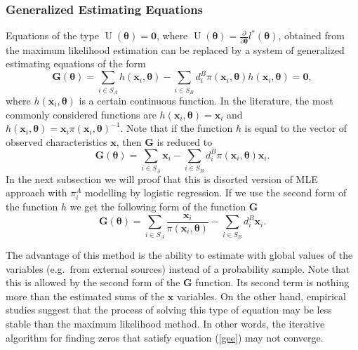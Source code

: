 \documentclass[
]{jss}
\begin{document}
\subsubsection{Generalized Estimating Equations}\label{sec-ipw-gee}

Equations of the type
\(\operatorname{U}(\boldsymbol{\theta}) = \boldsymbol{0}\), where
\(\operatorname{U}(\boldsymbol{\theta}) = \frac{\partial}{\partial \boldsymbol{\theta}} l^*(\boldsymbol{\theta})\),
obtained from the maximum likelihood estimation can be replaced by a
system of generalized estimating equations of the form \begin{equation}
\label{gee}
\mathbf{G}(\boldsymbol{\theta})=\sum_{i \in S_A} h\left(\boldsymbol{x}_i, \boldsymbol{\theta}\right)-\sum_{i \in S_B} d_i^B \pi\left(\boldsymbol{x}_i, \boldsymbol{\theta}\right) h\left(\boldsymbol{x}_i, \boldsymbol{\theta}\right) = \boldsymbol{0},
\end{equation} where
\(h\left(\boldsymbol{x}_i, \boldsymbol{\theta}\right)\) is a certain
continuous function. In the literature, the most commonly considered
functions are
\(h\left(\boldsymbol{x}_i, \boldsymbol{\theta}\right) = \boldsymbol{x}_i\)
and
\(h\left(\boldsymbol{x}_i, \boldsymbol{\theta}\right) = \boldsymbol{x}_i \pi\left(\boldsymbol{x}_i, \boldsymbol{\theta}\right)^{-1}\).
Note that if the function \(h\) is equal to the vector of observed
characteristics \(\boldsymbol{x}\), then \(\mathbf{G}\) is reduced to \[
\mathbf{G}(\boldsymbol{\theta}) = \sum_{i \in S_A} \boldsymbol{x}_i-\sum_{i \in S_B} d_i^B \pi\left(\boldsymbol{x}_i, \boldsymbol{\theta}\right) \boldsymbol{x}_i.
\] In the next subsection we will proof that this is disorted version of
MLE approach with \(\pi_i^A\) modelling by logistic regression. If we
use the second form of the function \(h\) we get the following form of
the function \(\mathbf{G}\) \[
\mathbf{G}(\boldsymbol{\theta}) = \sum_{i \in S_A} \frac{\boldsymbol{x}_i}{\pi\left(\boldsymbol{x}_i, \boldsymbol{\theta}\right) }-\sum_{i \in S_B} d_i^B \boldsymbol{x}_i.
\]

The advantage of this method is the ability to estimate with global
values of the variables (e.g.~from external sources) instead of a
probability sample. Note that this is allowed by the second form of the
\(\mathbf{G}\) function. Its second term is nothing more than the
estimated sums of the \(\boldsymbol{x}\) variables. On the other hand,
empirical studies suggest that the process of solving this type of
equation may be less stable than the maximum likelihood method. In other
words, the iterative algorithm for finding zeros that satisfy equation
(\ref{gee}) may not converge.
\end{document}
